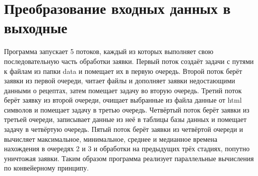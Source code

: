 \section{Преобразование входных данных в выходные}

\hspace{1.25cm}
Программа запускает 5 потоков, каждый из которых выполняет свою последовательную часть обработки заявки. Первый поток создаёт задачи с путями к файлам из папки data и помещает их в первую очередь.  Второй поток берёт заявки из первой очереди, читает файлы и дополняет заявки недостающими данными о рецептах, затем помещает задачу во вторую очередь. Третий поток берёт заявку из второй очереди, очищает выбранные из файла данные от html символов и помещает задачу в третью очередь. Четвёртый поток берёт заявки из третьей очереди, записывает данные из неё в таблицы базы данных и помещает задачу в четвёртую очередь. Пятый поток берёт заявки из четвёртой очереди и вычисляет максимальное, минимальное, среднее и медианное времена нахождения в очередях 2 и 3 и обработки на предыдущих трёх стадиях, попутно уничтожая заявки. Таким образом программа реализует параллельные вычисления по конвейерному принципу.~\cite{appmaster}